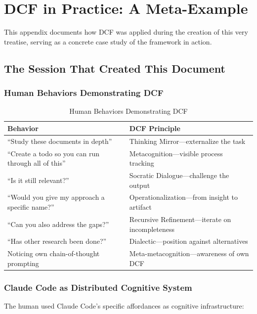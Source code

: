 \chapter{DCF in Practice: A Meta-Example}

This appendix documents how DCF was applied during the creation of this very treatise, serving as a concrete case study of the framework in action.

\section{The Session That Created This Document}

\subsection{Human Behaviors Demonstrating DCF}

\begin{table}[H]
\centering
\small
\begin{tabular}{ll}
\toprule
\textbf{Behavior} & \textbf{DCF Principle} \\
\midrule
``Study these documents in depth'' & Thinking Mirror---externalize the task \\
``Create a todo so you can run through all of this'' & Metacognition---visible process tracking \\
``Is it still relevant?'' & Socratic Dialogue---challenge the output \\
``Would you give my approach a specific name?'' & Operationalization---from insight to artifact \\
``Can you also address the gaps?'' & Recursive Refinement---iterate on incompleteness \\
``Has other research been done?'' & Dialectic---position against alternatives \\
Noticing own chain-of-thought prompting & Meta-metacognition---awareness of own DCF \\
\bottomrule
\end{tabular}
\caption{Human Behaviors Demonstrating DCF}
\end{table}

\subsection{Claude Code as Distributed Cognitive System}

The human used Claude Code's specific affordances as cognitive infrastructure:

